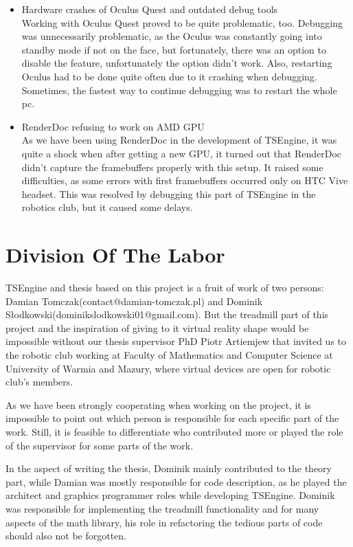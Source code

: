 \begin{itemize}
    \item {Hardware crashes of Oculus Quest and outdated debug tools}\\
    Working with Oculus Quest proved to be quite problematic, too. Debugging was unnecessarily problematic, as the Oculus was constantly going into standby mode if not on the face, but fortunately, there was an option to disable the feature, unfortunately the option didn't work. Also, restarting Oculus had to be done quite often due to it crashing when debugging. Sometimes, the fastest way to continue debugging was to restart the whole pc.
    
    \item {RenderDoc refusing to work on AMD GPU}\\
    As we have been using RenderDoc in the development of TSEngine, it was quite a shock when after getting a new GPU, it turned out that RenderDoc didn't capture the framebuffers properly with this setup. It raised some difficulties, as some errors with first framebuffers occurred only on HTC Vive headset. This was resolved by debugging this part of TSEngine in the robotics club, but it caused some delays.
\end{itemize}

\newpage
\section{Division Of The Labor}
\label{sec:labor}
\hspace{\parindent}
TSEngine and thesis based on this project is a fruit of work of two persons: Damian Tomczak(contact@damian-tomczak.pl) and Dominik Słodkowski(dominikslodkowski01@gmail.com).
But the treadmill part of this project and the inspiration of giving to it virtual reality shape would be impossible without our thesis supervisor PhD Piotr Artiemjew that invited us to the robotic club working at Faculty of Mathematics and Computer Science at University of Warmia and Mazury, where virtual devices are open for robotic club's members.

As we have been strongly cooperating when working on the project, it is impossible to point out which person is responsible for each specific part of the work. Still, it is feasible to differentiate who contributed more or played the role of the supervisor for some parts of the work.

In the aspect of writing the thesis, Dominik mainly contributed to the theory part, while Damian was mostly responsible for code description, as he played the architect and graphics programmer roles while developing TSEngine. Dominik was responsible for implementing the treadmill functionality and for many aspects of the math library, his role in refactoring the tedious parts of code should also not be forgotten.

